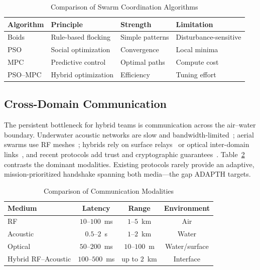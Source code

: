 \documentclass[journal]{IEEEtran}
\begin{document}
\begin{table}[!t]
\centering
\caption{Comparison of Swarm Coordination Algorithms}
\label{tab:coord}
\begin{tabular}{p{1.5cm}p{2.0cm}p{1.4cm}p{1.4cm}}
\toprule
Algorithm & Principle & Strength & Limitation\\
\midrule
Boids    & Rule-based flocking & Simple patterns & Disturbance-sensitive\\
PSO      & Social optimization & Convergence     & Local minima\\
MPC      & Predictive control  & Optimal paths   & Compute cost\\
PSO--MPC & Hybrid optimization & Efficiency      & Tuning effort\\
\bottomrule
\end{tabular}
\end{table}

\subsection{Cross-Domain Communication}
The persistent bottleneck for hybrid teams is communication across the air--water
boundary. Underwater acoustic networks are slow and
bandwidth-limited~\cite{pompili2009underwater}; aerial swarms use RF
meshes~\cite{li2023rf}; hybrids rely on surface
relays~\cite{quattrini2022multirobot} or optical inter-domain
links~\cite{zhang2023rfoptical}, and recent protocols add trust and cryptographic
guarantees~\cite{singh2025simulation}. Table~\ref{tab:comm} contrasts the dominant
modalities. Existing protocols rarely provide an adaptive, mission-prioritized
handshake spanning both media---the gap ADAPTH targets.

\begin{table}[!t]
\centering
\caption{Comparison of Communication Modalities}
\label{tab:comm}
\begin{tabular}{lccc}
\toprule
Medium & Latency & Range & Environment\\
\midrule
RF              & $10$--$100$~ms  & $1$--$5$~km  & Air\\
Acoustic        & $0.5$--$2$~s    & $1$--$2$~km  & Water\\
Optical         & $50$--$200$~ms  & $10$--$100$~m & Water/surface\\
Hybrid RF--Acoustic & $100$--$500$~ms & up to $2$~km & Interface\\
\bottomrule
\end{tabular}
\end{table}
\end{document}
